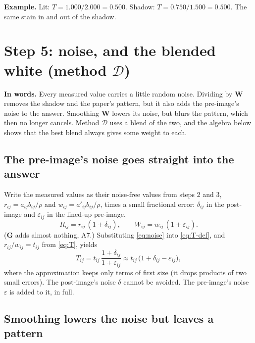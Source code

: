 \documentclass[11pt,letter]{article}
\newcommand{\iG}{\mathbf{G}}   %
\newcommand{\iW}{\mathbf{W}}   %
\newcommand{\MD}{\mathcal{D}}
\begin{document}
\textbf{Example.}  Lit: $T = 1.000 / 2.000 = 0.500$.  Shadow:
$T = 0.750 / 1.500 = 0.500$.  The same stain in and out of the shadow.

\section{Step 5: noise, and the blended white (method \texorpdfstring{$\MD$}{D})}
\label{sec:noise}

\textbf{In words.}  Every measured value carries a little random noise.
Dividing by $\iW$ removes the shadow and the paper's pattern, but it also
adds the pre-image's noise to the answer.  Smoothing $\iW$ lowers its noise,
but blurs the pattern, which then no longer cancels.  Method $\MD$ uses a
blend of the two, and the algebra below shows that the best blend always
gives some weight to each.

\subsection{The pre-image's noise goes straight into the answer}

Write the measured values as their noise-free values from steps 2 and 3,
$r_{ij} = a_{ij} b_{ij}/\rho$ and $w_{ij} = a'_{ij} b_{ij}/\rho$, times a
small fractional error: $\delta_{ij}$ in the post-image and
$\varepsilon_{ij}$ in the lined-up pre-image,
\begin{equation}
  R_{ij} = r_{ij}\,(1 + \delta_{ij}), \qquad
  W_{ij} = w_{ij}\,(1 + \varepsilon_{ij}) .
  \label{eq:noise}
\end{equation}
($\iG$ adds almost nothing, A7.)  Substituting \eqref{eq:noise} into
\eqref{eq:T-def}, and $r_{ij}/w_{ij} = t_{ij}$ from \eqref{eq:T}, yields
\begin{equation}
  T_{ij} = t_{ij}\, \frac{1 + \delta_{ij}}{1 + \varepsilon_{ij}}
         \approx t_{ij}\,\bigl(1 + \delta_{ij} - \varepsilon_{ij}\bigr),
  \label{eq:T-noise}
\end{equation}
where the approximation keeps only terms of first size (it drops products
of two small errors).  The post-image's noise $\delta$ cannot be avoided.
The pre-image's noise $\varepsilon$ is added to it, in full.

\subsection{Smoothing lowers the noise but leaves a pattern}
\end{document}
